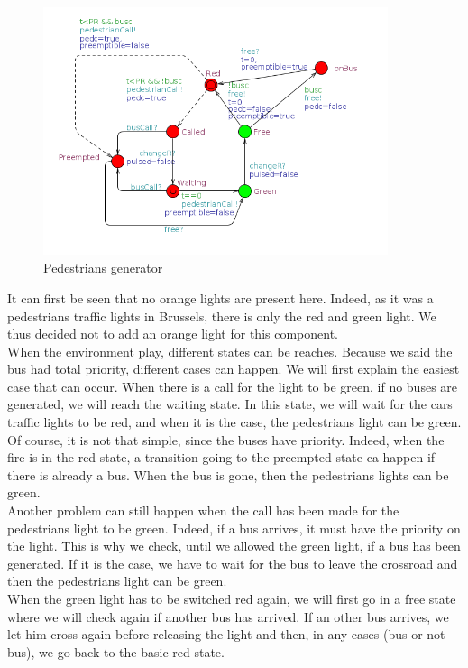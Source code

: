 \begin{figure}[H]\label{fig:crosswalk}
  \centering
    \includegraphics[width=0.9\textwidth]{picture/crosswalk.png}
    \caption{Pedestrians generator}
\end{figure}
\noindent It can first be seen that no orange lights are present here. Indeed, as it was a pedestrians traffic lights in Brussels, there is only the red and green light. We thus decided not to add an orange light for this component. \\
When the environment play, different states can be reaches. Because we said the bus had total priority, different cases can happen. We will first explain the easiest case that can occur. When there is a call for the light to be green, if no buses are generated, we will reach the waiting state. In this state, we will wait for the cars traffic lights to be red, and when it is the case, the pedestrians light can be green. Of course, it is not that simple, since the buses have priority. Indeed, when the fire is in the red state, a transition going to the preempted state ca happen if there is already a bus. When the bus is gone, then the pedestrians lights can be green.\\
Another problem can still happen when the call has been made for the pedestrians light to be green. Indeed, if a bus arrives, it must have the priority on the light. This is why we check, until we allowed the green light, if a bus has been generated. If it is the case, we have to wait for the bus to leave the crossroad and then the pedestrians light can be green. \\
When the green light has to be switched red again, we will first go in a free state where we will check again if another bus has arrived. If an other bus arrives, we let him cross again before releasing the light and then, in any cases (bus or not bus), we go back to the basic red state.
